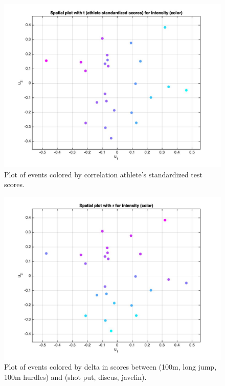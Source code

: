 \documentclass[12pt]{exam}
\begin{document}
\begin{questions}
   \begin{figure}[hpb!]
    \centering
    \includegraphics[scale=0.3]{data/spatial_t.jpg}
    \caption{Plot of events colored by correlation athlete's standardized test scores.}
    \label{fig:intensity_plot_t}
  \end{figure}

   \begin{figure}[hpb!]
    \centering
    \includegraphics[scale=0.3]{data/spatial_delta.jpg}
    \caption{Plot of events colored by delta in scores between (100m, long jump, 100m hurdles) and (shot put, discus, javelin).}
    \label{fig:intensity_plot_delta}
  \end{figure}


\end{questions}
\end{document}
